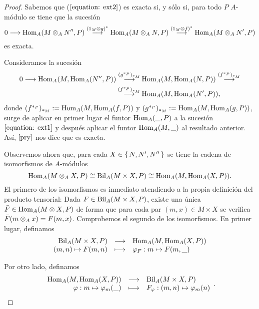 \documentclass[../main.tex]{subfiles}
\begin{document}
\begin{proof}
	Sabemos que ($\ref{equation: ext2}$) es exacta si, y sólo si, para todo $P$ $A$-módulo se tiene que la sucesión
	\begin{equation}\label{equation: ext3}
	0\longrightarrow\operatorname{Hom}_A(M\otimes_A N'',P)\overset{(1_M\otimes g)^*}{\longrightarrow}\operatorname{Hom}_A(M\otimes_A N,P)\overset{(1_M\otimes f)^*}{\longrightarrow}\operatorname{Hom}_A(M\otimes_A N',P)
	\end{equation}
	es exacta.

	Consideramos la sucesión
	\begin{align*}\label{equation: ext4}
	0\longrightarrow\operatorname{Hom}_A(M,\operatorname{Hom}_A(N'',P))\overset{(g^{*_P})_{*_M}}{\longrightarrow}&\operatorname{Hom}_A(M,\operatorname{Hom}_A(N,P))\overset{(f^{*_P})_{*_M}}{\longrightarrow}\\
	\overset{(f^{*_P})_{*_M}}{\longrightarrow}&\operatorname{Hom}_A(M,\operatorname{Hom}_A(N',P)),
	\end{align*}
	donde $(f^{*_P})_{*_M}:=\operatorname{Hom}_A(M,\operatorname{Hom}_A(f,P))$ y $(g^{*_P})_{*_M}:=\operatorname{Hom}_A(M,\operatorname{Hom}_A(g,P))$, surge de aplicar en primer lugar el funtor $\operatorname{Hom}_A(\_,P)$ a la sucesión $\ref{equation: ext1}$ y después aplicar el funtor $\operatorname{Hom}_A(M,\_)$ al resultado anterior. Así, $\ref{pry}$ nos dice que es exacta.

	Observemos ahora que, para cada $X\in\set{N,N',N''}$ se tiene la cadena de isomorfismos de $A$-módulos
	$$\operatorname{Hom}_A(M\otimes_A X,P)\cong\operatorname{Bil}_A(M\times X,P)\cong\operatorname{Hom}_A(M,\operatorname{Hom}_A(X,P)).$$
	El primero de los isomorfismos es inmediato atendiendo a la propia definición del producto tensorial: Dada $F\in\operatorname{Bil}_A(M\times X,P)$, existe una única $\Bar{F}\in\operatorname{Hom}_A(M\otimes X,P)$ de forma que para cada par $(m,x)\in M\times X$ se verifica $\Bar{F}(m\otimes_A x)=F(m,x)$. Comprobemos el segundo de los isomorfismos. En primer lugar, definamos
	$$\begin{array}{rcl}
	\operatorname{Bil}_A(M\times X,P)&\longrightarrow&\operatorname{Hom}_A(M,\operatorname{Hom}_A(X,P))\\
	(m,n)\mapsto F(m,n)&\longmapsto& \varphi_F: m \mapsto F(m,\_)
	\end{array}$$

	Por otro lado, definamos
	$$\begin{array}{rcl}
	\operatorname{Hom}_A(M,\operatorname{Hom}_A(X,P))&\longrightarrow&\operatorname{Bil}_A(M\times X,P)\\
	\varphi: m \mapsto \varphi_m(\_)&\longmapsto&F_\varphi: (m,n) \mapsto \varphi_m(n)
	\end{array}.$$


\end{proof}
\end{document}
